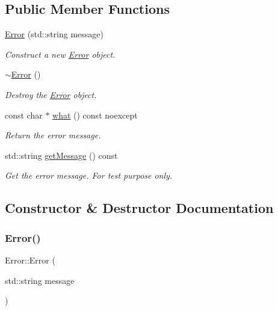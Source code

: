 \subsection*{Public Member Functions}
\begin{DoxyCompactItemize}
\item 
\mbox{\hyperlink{class_error_a531664ff4c9e228a269aea757d23236f}{Error}} (std\+::string message)
\begin{DoxyCompactList}\small\item\em Construct a new \mbox{\hyperlink{class_error}{Error}} object. \end{DoxyCompactList}\item 
\mbox{\label{class_error_a1a45d42a3a035d510333cdfeb36a0e93}} 
\mbox{\hyperlink{class_error_a1a45d42a3a035d510333cdfeb36a0e93}{$\sim$\+Error}} ()
\begin{DoxyCompactList}\small\item\em Destroy the \mbox{\hyperlink{class_error}{Error}} object. \end{DoxyCompactList}\item 
const char $\ast$ \mbox{\hyperlink{class_error_a2735217cefcd50320daf7733cf3150a7}{what}} () const noexcept
\begin{DoxyCompactList}\small\item\em Return the error message. \end{DoxyCompactList}\item 
std\+::string \mbox{\hyperlink{class_error_a25241c4a23ba6e25a7e8169edc163d9d}{get\+Message}} () const
\begin{DoxyCompactList}\small\item\em Get the error message. For test purpose only. \end{DoxyCompactList}\end{DoxyCompactItemize}


\subsection{Constructor \& Destructor Documentation}
\mbox{\label{class_error_a531664ff4c9e228a269aea757d23236f}} 
\subsubsection{\texorpdfstring{Error()}{Error()}}
{\footnotesize\ttfamily Error\+::\+Error (\begin{DoxyParamCaption}\item[{std\+::string}]{message }\end{DoxyParamCaption})}



